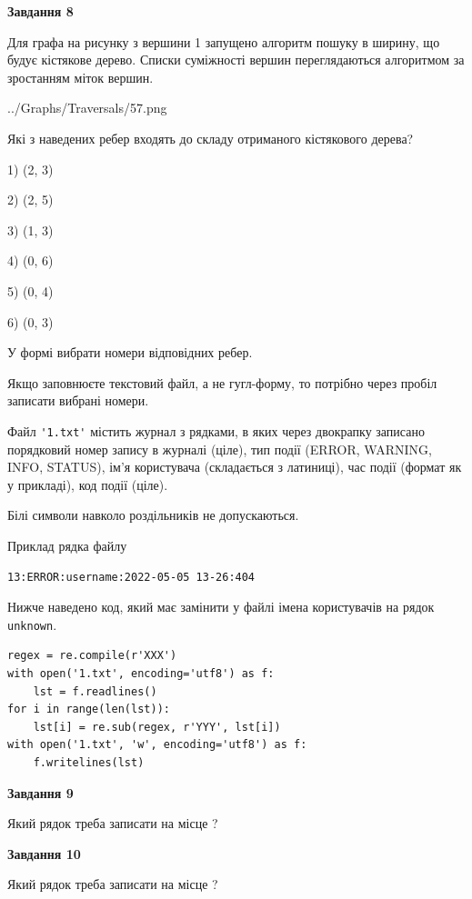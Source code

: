 \documentclass[12pt, ukrainian]{article}
\def\code#1{\Verb!#1!}
\begin{document}
{\begin {large}
{\begin {center}\textbf{Завдання 8}\end {center}}\par
Для графа на рисунку з вершини 1 запущено алгоритм пошуку в ширину, що будує кістякове дерево. Списки суміжності вершин переглядаються алгоритмом за зростанням міток вершин.\par
\begin{center}
	{../Graphs/Traversals/57.png}
\end{center}
\par Які з наведених ребер входять до складу отриманого кістякового дерева?\par
1) (2, 3)\par
2) (2, 5)\par
3) (1, 3)\par
4) (0, 6)\par
5) (0, 4)\par
6) (0, 3)\par
{\vskip 15pt} У формі вибрати номери відповідних ребер.


Якщо заповнюєте текстовий файл, а не гугл-форму, то потрібно через пробіл записа\-ти вибрані номери.\par
\newpage


Файл \code{'1.txt'} містить журнал з рядками, в яких через двокрапку записано поряд\-ко\-вий номер запису в журналі (ціле), тип події (ERROR, WARNING, INFO, STATUS), ім'я користувача (складається з латиниці), час події (фор\-мат як у прикладі), код події (ціле).

Білі символи навколо роздільників не допускаються.

Приклад рядка файлу



\begin{verbatim}
13:ERROR:username:2022-05-05 13-26:404
\end{verbatim}


Нижче наведено код, який має замінити у файлі імена користувачів на рядок \code{unknown}.



\begin{verbatim}
regex = re.compile(r'XXX')
with open('1.txt', encoding='utf8') as f:
    lst = f.readlines()
for i in range(len(lst)):
    lst[i] = re.sub(regex, r'YYY', lst[i])
with open('1.txt', 'w', encoding='utf8') as f:
    f.writelines(lst)
\end{verbatim}




{\begin {center}\textbf{Завдання 9}\end {center}}\par
Який рядок треба записати на місце  ?\par
\vspace{5mm}


{\begin {center}\textbf{Завдання 10}\end {center}}\par
Який рядок треба записати на місце  ?\par


\newpage


\end {large}}
\end{document}
